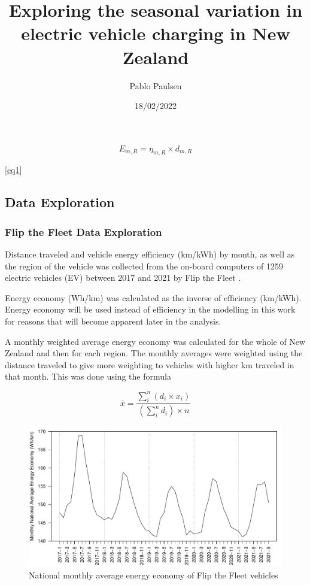 \documentclass[
]{article}
\title{Exploring the seasonal variation in electric vehicle charging in
New Zealand}
\author{Pablo Paulsen}
\date{18/02/2022}
\begin{document}
\maketitle

\begin{equation}
\label{eq1}
E_{m,R} = \eta_{m,R} \times d_{m,R}
\end{equation}

\ref{eq1}

\hypertarget{data-exploration}{%
\subsection{Data Exploration}\label{data-exploration}}

\hypertarget{flip-the-fleet-data-exploration}{%
\subsubsection{Flip the Fleet Data
Exploration}\label{flip-the-fleet-data-exploration}}

Distance traveled and vehicle energy efficiency (km/kWh) by month, as
well as the region of the vehicle was collected from the on-board
computers of 1259 electric vehicles (EV) between 2017 and 2021 by Flip
the Fleet \cite{ftf}.

Energy economy (Wh/km) was calculated as the inverse of efficiency
(km/kWh). Energy economy will be used instead of efficiency in the
modelling in this work for reasons that will become apparent later in
the analysis.

A monthly weighted average energy economy was calculated for the whole
of New Zealand and then for each region. The monthly averages were
weighted using the distance traveled to give more weighting to vehicles
with higher km traveled in that month. This was done using the formula

\[\bar{x} = \frac{\sum_{i}^{n} (d_i\times x_i)}{\left(\sum_{i}^{n} d_i\right)\times n}\]

\begin{figure}
\centering
\includegraphics{final_report_files/figure-latex/consum_plot-1.pdf}
\caption{National monthly average energy economy of Flip the Fleet
vehicles\label{fig:consum_plot}}
\end{figure}
\end{document}
